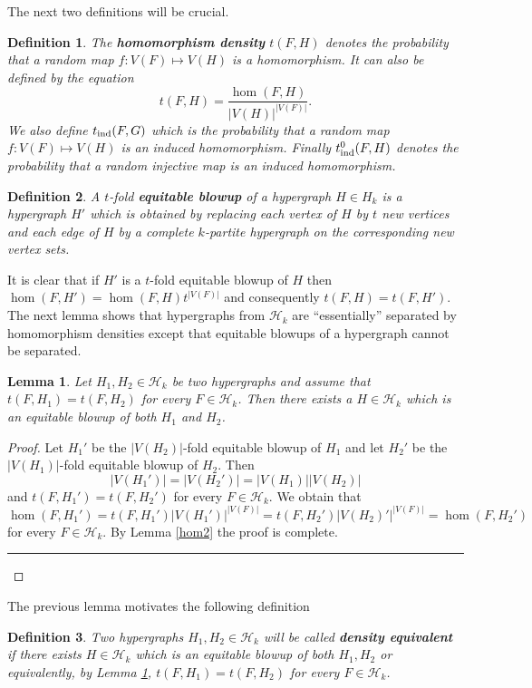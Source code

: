 \documentclass [11pt] {article}
\newcommand{\qed} {\hspace {0.1in} \rule {1.5mm} {3.5mm}}
\newtheorem{lemma}{Lemma}[section]
\newtheorem{definition}{Definition}[section]
\begin{document}
The next two definitions will be crucial.

\begin{definition} The {\bf homomorphism density} $t(F,H)$ denotes the
probability that a random map $f:V(F)\mapsto V(H)$ is a homomorphism.
It can also be defined by the equation
$$t(F,H)=\frac{\hom(F,H)}{|V(H)|^{|V(F)|}}.$$
We also define $t_{\rm ind}(F,G)$ which is the probability that a random map
$f:V(F)\mapsto V(H)$ is an induced homomorphism. Finally $t^0_{\rm ind}(F,H)$ 
denotes the probability that a random injective map is an induced homomorphism.
\end{definition}

\begin{definition} A $t$-fold {\bf equitable blowup} of a hypergraph
$H\in H_k$ is a hypergraph $H'$ which is obtained by replacing each
vertex of $H$ by $t$ new vertices and each edge of $H$ by a complete
$k$-partite hypergraph on the corresponding new vertex sets.
\end{definition}

It is clear that if $H'$ is a $t$-fold equitable blowup of $H$ then
$\hom(F,H')=\hom(F,H)t^{|V(F)|}$ and consequently $t(F,H)=t(F,H')$.
The next lemma shows that hypergraphs from $\mathcal{H}_k$ are
 ``essentially'' separated by homomorphism densities except that
equitable blowups of a hypergraph cannot be separated.

\begin{lemma}\label{hom3} Let $H_1,H_2\in\mathcal{H}_k$ be two hypergraphs
  and assume that $t(F,H_1)=t(F,H_2)$ for every $F\in\mathcal{H}_k$. Then there
  exists a
$H\in\mathcal{H}_k$ which is an equitable blowup of both $H_1$ and $H_2$.
\end{lemma}

\begin{proof} Let $H_1'$ be the $|V(H_2)|$-fold equitable blowup of $H_1$ and
  let $H_2'$ be the $|V(H_1)|$-fold equitable blowup of $H_2$. Then
  $$|V(H_1')|=
|V(H_2')|=|V(H_1)||V(H_2)|$$ and
$t(F,H_1')=t(F,H_2')$ for every $F\in\mathcal{H}_k$. We obtain that
$$\hom(F,H_1')=t(F,H_1')|V(H_1')|^{|V(F)|}=t(F,H_2')|V(H_2)'|^{|V(F)|}=
\hom(F,H_2')$$
for every $F\in\mathcal{H}_k$. By Lemma \ref{hom2} the proof is complete.
\qed\end{proof}

The previous lemma motivates the following definition

\begin{definition} Two hypergraphs $H_1,H_2\in\mathcal{H}_k$ will be called
{\bf density equivalent} if there exists
 $H\in\mathcal{H}_k$ which is an equitable
blowup of both $H_1,H_2$ or equivalently, by Lemma \ref{hom3},
$t(F,H_1)=t(F,H_2)$ for every $F\in\mathcal{H}_k$.
\end{definition}
\end{document}
